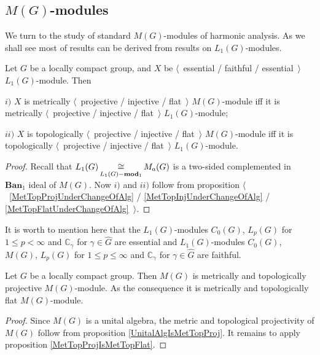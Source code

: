 
\subsection{\texorpdfstring{$M(G)$}{M(G)}-modules}
\label{SubSectionMGModules}

We turn to the study of standard $M(G)$-modules of harmonic analysis. As we shall see most of results can be derived from results on $L_1(G)$-modules.

\begin{proposition}\label{MGMetTopProjInjFlatRedToL1} Let $G$ be a locally compact group, and $X$ be $\langle$~essential / faithful / essential~$\rangle$ $L_1(G)$-module. Then

$i)$ $X$ is metrically $\langle$~projective / injective / flat~$\rangle$ $M(G)$-module iff it is metrically $\langle$~projective / injective / flat~$\rangle$ $L_1(G)$-module;

$ii)$ $X$ is topologically $\langle$~projective / injective / flat~$\rangle$ $M(G)$-module iff it is topologically $\langle$~projective / injective / flat~$\rangle$ $L_1(G)$-module.
\end{proposition}
\begin{proof} Recall that $L_1(G)\mathop{\mathbin{\cong}}\limits_{L_1(G)-\mathbf{mod}_1}M_a(G)$ is a two-sided complemented in $\mathbf{Ban}_1$ ideal of $M(G)$. Now $i)$ and $ii)$ follow from proposition $\langle$~\ref{MetTopProjUnderChangeOfAlg} / \ref{MetTopInjUnderChangeOfAlg}  / \ref{MetTopFlatUnderChangeOfAlg}~$\rangle$.
\end{proof} 

It is worth to mention here that the $L_1(G)$-modules $C_0(G)$, $L_p(G)$ for $1\leq p<\infty$ and $\mathbb{C}_\gamma$ for $\gamma\in\widehat{G}$ are essential and $L_1(G)$-modules $C_0(G)$, $M(G)$, $L_p(G)$ for $1\leq p\leq \infty$ and $\mathbb{C}_\gamma$ for $\gamma\in\widehat{G}$ are faithful. 

\begin{proposition}\label{MGModMGMetTopProjFlatCharac} Let $G$ be a locally compact group. Then $M(G)$ is metrically and topologically projective $M(G)$-module. As the consequence it is metrically and topologically flat $M(G)$-module.
\end{proposition} 
\begin{proof} Since $M(G)$ is a unital algebra, the metric and topological projectivity of $M(G)$ follow from proposition \ref{UnitalAlgIsMetTopProj}. It remains to apply proposition \ref{MetTopProjIsMetTopFlat}.
\end{proof}

